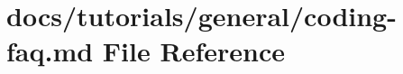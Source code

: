 \hypertarget{coding-faq_8md}{}\section{docs/tutorials/general/coding-\/faq.md File Reference}
\label{coding-faq_8md}
